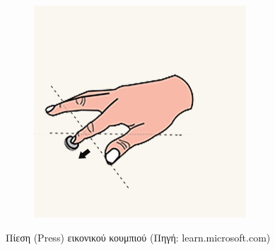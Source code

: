 \begin{enumerate}
\begin{figure}[!ht]
\begin{subfigure}{0.25\textwidth}
        \end{subfigure}%
        \begin{subfigure}{0.25\textwidth}
            \centering
            \includegraphics[width=0.9\linewidth]{images/hololens_interaction_press_step4.jpg}
        \end{subfigure}%
        \caption[Πίεση (Press) εικονικού κουμπιού]{Πίεση (Press) εικονικού κουμπιού {\footnotesize (Πηγή: learn.microsoft.com)}}\label{fig:hololensInteractionPress}
    \end{figure}


\end{enumerate}
